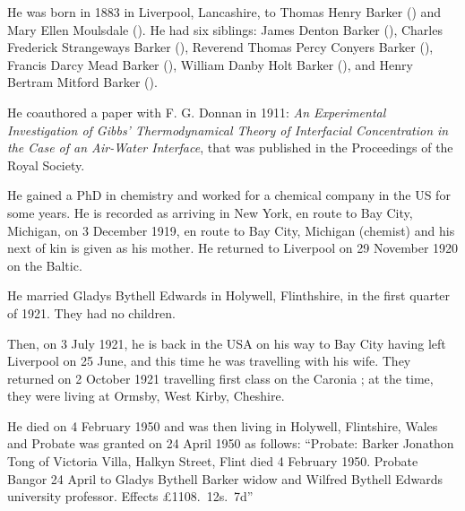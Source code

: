 
He was born in 1883 \cite{JTBarkerBirth} in Liverpool, Lancashire, to Thomas Henry Barker () and Mary Ellen Moulsdale (). He had six siblings:  James Denton Barker (), Charles Frederick Strangeways Barker (),  Reverend Thomas Percy Conyers Barker (), Francis Darcy Mead Barker (), William Danby Holt Barker (), and Henry Bertram Mitford Barker (). 

He coauthored a paper with F. G. Donnan in 1911: \emph{An Experimental Investigation of Gibbs' Thermodynamical Theory of Interfacial Concentration in the Case of an Air-Water Interface}, that was published in the Proceedings of the Royal Society.\cite{RSPA}

He gained a PhD in chemistry and worked for a chemical company in the US for some years. He is recorded as arriving in New York, en route to Bay City, Michigan, on 3 December 1919, en route to Bay City, Michigan (chemist) and his next of kin is given as his mother. He returned to Liverpool on 29 November 1920 on the Baltic.\cite{JTBarkerTravel1}

He married Gladys Bythell Edwards in Holywell, Flinthshire, in the first quarter of 1921. \cite{JTBarkerMarriage} They had  no children.

Then, on 3 July 1921, he is back in the USA on his way to Bay City having left Liverpool on 25 June, and this time he was travelling with his wife. They returned on 2 October 1921 travelling first class on the Caronia \cite{JTBarkerTravel2};  at the time,  they were living at Ormsby, West Kirby, Cheshire. 

He died on 4 February 1950 and was then living in Holywell, Flintshire, Wales and Probate was granted  on 24 April 1950 as follows:
``Probate: Barker Jonathon Tong of Victoria Villa, Halkyn Street, Flint died 4 February 1950. Probate Bangor 24 April to Gladys Bythell Barker widow and Wilfred Bythell Edwards university professor. Effects \pounds1108.~12s.~7d''
